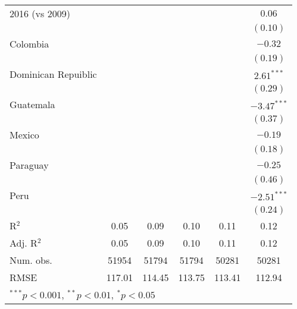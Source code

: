 \documentclass{article}
\begin{document}
\begin{table}[h!]
\begin{center}
\begin{tabular}{l c c c c c }
2016 (vs 2009)             &               &               &               &               & $0.06$        \\
                           &               &               &               &               & $(0.10)$      \\
Colombia                   &               &               &               &               & $-0.32$       \\
                           &               &               &               &               & $(0.19)$      \\
Dominican Repuiblic        &               &               &               &               & $2.61^{***}$  \\
                           &               &               &               &               & $(0.29)$      \\
Guatemala                  &               &               &               &               & $-3.47^{***}$ \\
                           &               &               &               &               & $(0.37)$      \\
Mexico                     &               &               &               &               & $-0.19$       \\
                           &               &               &               &               & $(0.18)$      \\
Paraguay                   &               &               &               &               & $-0.25$       \\
                           &               &               &               &               & $(0.46)$      \\
Peru                       &               &               &               &               & $-2.51^{***}$ \\
                           &               &               &               &               & $(0.24)$      \\
\hline
R$^2$                      & 0.05          & 0.09          & 0.10          & 0.11          & 0.12          \\
Adj. R$^2$                 & 0.05          & 0.09          & 0.10          & 0.11          & 0.12          \\
Num. obs.                  & 51954         & 51794         & 51794         & 50281         & 50281         \\
RMSE                       & 117.01        & 114.45        & 113.75        & 113.41        & 112.94        \\
\hline
\multicolumn{6}{l}{\scriptsize{$^{***}p<0.001$, $^{**}p<0.01$, $^*p<0.05$}}
\end{tabular}
\end{center}
\end{table}

\break
\end{document}
